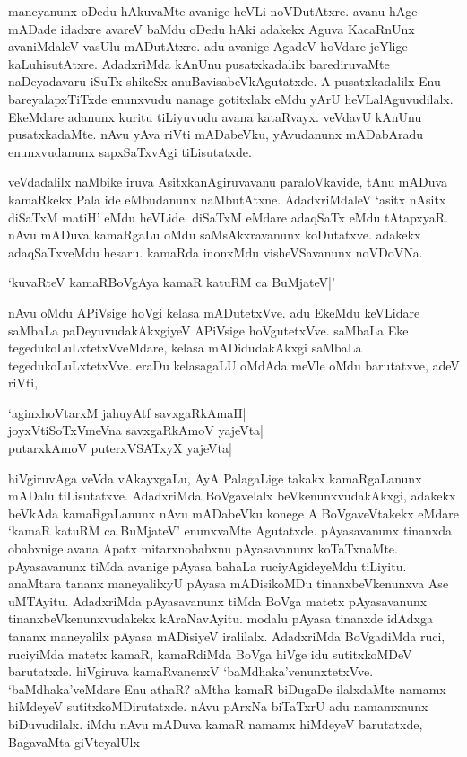 maneyanunx oDedu hAkuvaMte avanige heVLi noVDutAtxre. avanu hAge mADade idadxre avareV baMdu oDedu hAki adakekx Aguva KacaRnUnx avaniMdaleV vasUlu mADutAtxre. adu avanige AgadeV hoVdare jeYlige kaLuhisutAtxre. AdadxriMda kAnUnu pusatxkadalilx barediruvaMte naDeyadavaru iSuTx shikeSx anuBavisabeVkAgutatxde. A pusatxkadalilx Enu bareyalapxTiTxde enunxvudu nanage gotitxlalx eMdu yArU heVLalAguvudilalx. EkeMdare adanunx kuritu tiLiyuvudu avana kataRvayx. veVdavU kAnUnu pusatxkadaMte. nAvu yAva riVti mADabeVku, yAvudanunx mADabAradu enunxvudanunx sapxSaTxvAgi tiLisutatxde.

veVdadalilx naMbike iruva AsitxkanAgiruvavanu paraloVkavide, tAnu mADuva kamaRkekx Pala ide eMbudanunx naMbutAtxne. AdadxriMdaleV `asitx nAsitx diSaTxM matiH'  eMdu heVLide. diSaTxM eMdare adaqSaTx eMdu tAtapxyaR. nAvu mADuva kamaRgaLu oMdu saMsAkxravanunx koDutatxve. adakekx adaqSaTxveMdu hesaru. kamaRda inonxMdu visheVSavanunx noVDoVNa.

\begin{shloka}
`kuvaRteV kamaRBoVgAya kamaR katuRM ca BuMjateV|'
\end{shloka}

nAvu oMdu APiVsige hoVgi kelasa mADutetxVve. adu EkeMdu keVLidare saMbaLa paDeyuvudakAkxgiyeV APiVsige hoVgutetxVve. saMbaLa Eke tegedukoLuLxtetxVveMdare, kelasa mADidudakAkxgi saMbaLa tegedukoLuLxtetxVve. eraDu kelasagaLU oMdAda meVle oMdu barutatxve, adeV riVti,

\begin{shloka}
`aginxhoVtarxM jahuyAtf savxgaRkAmaH|\\
joyxVtiSoTxVmeVna savxgaRkAmoV yajeVta|\\
putarxkAmoV puterxVSATxyX yajeVta|
\end{shloka}

hiVgiruvAga veVda vAkayxgaLu, AyA PalagaLige takakx kamaRgaLanunx mADalu tiLisutatxve. AdadxriMda BoVgavelalx beVkenunxvudakAkxgi, adakekx beVkAda kamaRgaLanunx nAvu mADabeVku konege A BoVgaveVtakekx eMdare `kamaR katuRM ca BuMjateV' enunxvaMte Agutatxde. pAyasavanunx tinanxda obabxnige avana Apatx mitarxnobabxnu pAyasavanunx koTaTxnaMte. pAyasavanunx tiMda avanige pAyasa bahaLa ruciyAgideyeMdu tiLiyitu. anaMtara tananx maneyalilxyU pAyasa mADisikoMDu tinanxbeVkenunxva Ase uMTAyitu. AdadxriMda pAyasavanunx tiMda BoVga matetx pAyasavanunx tinanxbeVkenunxvudakekx kAraNavAyitu. modalu pAyasa tinanxde idAdxga tananx maneyalilx pAyasa mADisiyeV iralilalx. AdadxriMda BoVgadiMda ruci, ruciyiMda matetx kamaR, kamaRdiMda BoVga hiVge idu sutitxkoMDeV barutatxde. hiVgiruva kamaRvanenxV `baMdhaka'venunxtetxVve. `baMdhaka'veMdare Enu athaR? aMtha kamaR biDugaDe ilalxdaMte namamx hiMdeyeV sutitxkoMDirutatxde. nAvu pArxNa biTaTxrU adu namamxnunx biDuvudilalx. iMdu nAvu mADuva kamaR namamx hiMdeyeV barutatxde, BagavaMta giVteyalUlx-

